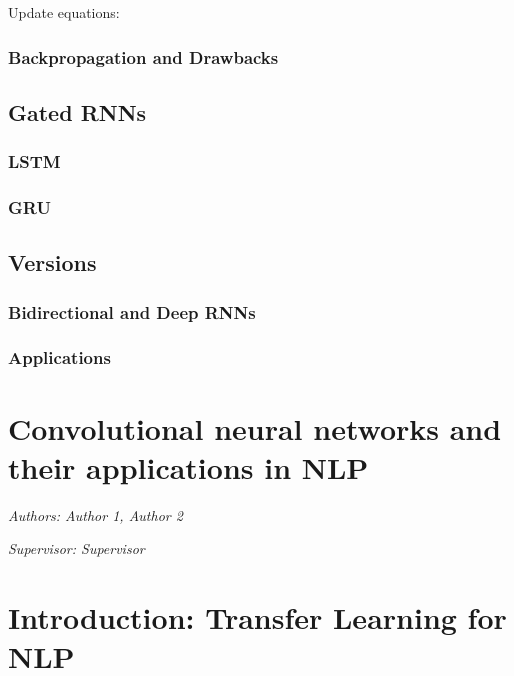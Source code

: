 \documentclass[]{krantz}
\begin{document}
Update equations:

\hypertarget{backpropagation-and-drawbacks}{%
\subsection{Backpropagation and Drawbacks}\label{backpropagation-and-drawbacks}}

\hypertarget{gated-rnns}{%
\section{Gated RNNs}\label{gated-rnns}}

\hypertarget{lstm}{%
\subsection{LSTM}\label{lstm}}

\hypertarget{gru}{%
\subsection{GRU}\label{gru}}

\hypertarget{versions}{%
\section{Versions}\label{versions}}

\hypertarget{bidirectional-and-deep-rnns}{%
\subsection{Bidirectional and Deep RNNs}\label{bidirectional-and-deep-rnns}}

\hypertarget{applications}{%
\subsection{Applications}\label{applications}}

\hypertarget{convolutional-neural-networks-and-their-applications-in-nlp}{%
\chapter{Convolutional neural networks and their applications in NLP}\label{convolutional-neural-networks-and-their-applications-in-nlp}}

\emph{Authors: Author 1, Author 2}

\emph{Supervisor: Supervisor}

\hypertarget{introduction-transfer-learning-for-nlp}{%
\chapter{Introduction: Transfer Learning for NLP}\label{introduction-transfer-learning-for-nlp}}
\end{document}
